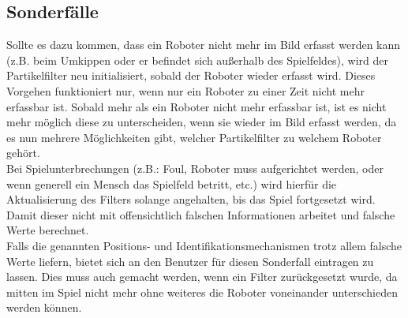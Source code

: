 \documentclass{ezb}
\begin{document}
\subsection{Sonderfälle}
Sollte es dazu kommen, dass ein Roboter nicht mehr im Bild erfasst werden kann (z.B. beim Umkippen oder er befindet sich außerhalb des Spielfeldes), wird der Partikelfilter neu initialisiert, sobald der Roboter wieder erfasst wird. Dieses Vorgehen funktioniert nur, wenn nur ein Roboter zu einer Zeit nicht mehr erfassbar ist. Sobald mehr als ein Roboter nicht mehr erfassbar ist, ist es nicht mehr möglich diese zu unterscheiden, wenn sie wieder im Bild erfasst werden, da es nun mehrere Möglichkeiten gibt, welcher Partikelfilter zu welchem Roboter gehört.\\
\linebreak
Bei Spielunterbrechungen (z.B.: Foul, Roboter muss aufgerichtet werden, oder wenn generell ein Mensch das Spielfeld betritt, etc.)  wird hierfür die Aktualisierung des Filters solange angehalten, bis das Spiel fortgesetzt wird. Damit dieser nicht mit offensichtlich falschen Informationen arbeitet und falsche Werte berechnet.\\
\linebreak
Falls die genannten Positions- und Identifikationsmechanismen trotz allem falsche Werte liefern, bietet sich an den Benutzer für diesen Sonderfall eintragen zu lassen. Dies muss auch gemacht werden, wenn ein Filter zurückgesetzt wurde, da mitten im Spiel nicht mehr ohne weiteres die Roboter voneinander unterschieden werden können.
\end{document}
